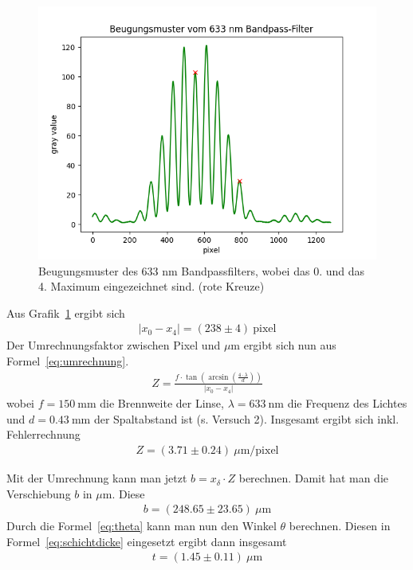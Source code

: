 \documentclass{article}
\begin{document}
\begin{figure}[H]
\centering
\caption{Beugungsmuster des 633 nm Bandpassfilters, wobei das 0. und das 4. Maximum eingezeichnet sind. (rote Kreuze)}
\label{fig:633nm_task3}
\includegraphics[scale=1]{633_for_task3.png}
\end{figure}

Aus Grafik~\ref{fig:633nm_task3} ergibt sich
\begin{align*}
|x_0-x_4| = (238 \pm 4)~\text{pixel}
\end{align*}
Der Umrechnungsfaktor zwischen Pixel und $\mu$m ergibt sich nun aus Formel~\eqref{eq:umrechnung}.
\begin{align*}
Z = \frac{f\cdot \tan\left(\operatorname{arcsin}\left(\frac{4\cdot \lambda}{d}\right)\right)}{|x_0-x_4|}
\end{align*}
wobei $f=150~$mm die Brennweite der Linse, $\lambda=633~$nm die Frequenz des Lichtes und $d=0.43~$mm der Spaltabstand ist (s. Versuch 2). Insgesamt ergibt sich inkl. Fehlerrechnung
\begin{align}
Z = (3.71 \pm 0.24)~\mu\text{m} / \text{pixel}
\end{align}

Mit der Umrechnung kann man jetzt $b=x_\delta\cdot Z$ berechnen. Damit hat man die Verschiebung $b$ in $\mu$m. Diese
\begin{align*}
b = (248.65\pm23.65)~\mu\text{m}
\end{align*}
Durch die Formel~\eqref{eq:theta} kann man nun den Winkel $\theta$ berechnen. Diesen in Formel~\eqref{eq:schichtdicke} eingesetzt ergibt dann insgesamt
\begin{align*}
t = (1.45\pm0.11)~\mu\text{m}
\end{align*}
\end{document}
